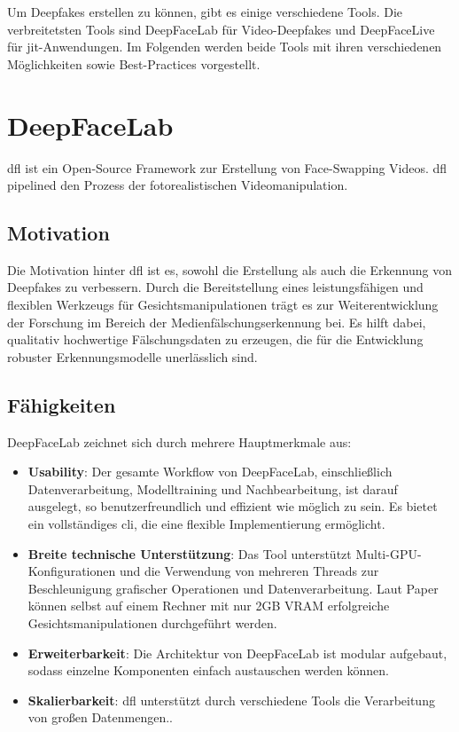 Um Deepfakes erstellen zu können, gibt es einige verschiedene Tools.
Die verbreitetsten Tools sind DeepFaceLab für Video-Deepfakes und DeepFaceLive für \gls{jit}-Anwendungen.
Im Folgenden werden beide Tools mit ihren verschiedenen Möglichkeiten sowie Best-Practices vorgestellt.

\section{DeepFaceLab}\label{sec:deepfacelab}
\gls{dfl} ist ein Open-Source Framework zur Erstellung von Face-Swapping Videos.
\gls{dfl} pipelined den Prozess der fotorealistischen Videomanipulation.

\subsection{Motivation}\label{subsec:motivation}
Die Motivation hinter \gls{dfl} ist es, sowohl die Erstellung als auch die Erkennung von Deepfakes zu verbessern.
Durch die Bereitstellung eines leistungsfähigen und flexiblen Werkzeugs für Gesichtsmanipulationen trägt es zur Weiterentwicklung der Forschung im Bereich der Medienfälschungserkennung bei.
Es hilft dabei, qualitativ hochwertige Fälschungsdaten zu erzeugen, die für die Entwicklung robuster Erkennungsmodelle unerlässlich sind\cite{deepfacelabintegratedflexibleextensible, deepfacelab}.

\subsection{Fähigkeiten}\label{subsec:fahigkeiten}
DeepFaceLab zeichnet sich durch mehrere Hauptmerkmale aus:
\begin{itemize}
    \item \textbf{Usability}: Der gesamte Workflow von DeepFaceLab, einschließlich Datenverarbeitung, Modelltraining und Nachbearbeitung, ist darauf ausgelegt, so benutzerfreundlich und effizient wie möglich zu sein.
     Es bietet ein vollständiges \gls{cli}, die eine flexible Implementierung ermöglicht.
    \item \textbf{Breite technische Unterstützung}: Das Tool unterstützt Multi-GPU-Konfigurationen und die Verwendung von mehreren Threads zur Beschleunigung grafischer Operationen und Datenverarbeitung.
     Laut Paper können selbst auf einem Rechner mit nur 2GB VRAM erfolgreiche Gesichtsmanipulationen durchgeführt werden\cite{deepfacelabintegratedflexibleextensible}.
    \item \textbf{Erweiterbarkeit}: Die Architektur von DeepFaceLab ist modular aufgebaut, sodass einzelne Komponenten einfach austauschen werden können\cite{deepfacelabintegratedflexibleextensible}.
    \item \textbf{Skalierbarkeit}: \gls{dfl} unterstützt durch verschiedene Tools die Verarbeitung von großen Datenmengen.\cite{deepfacelabintegratedflexibleextensible}.
\end{itemize}

